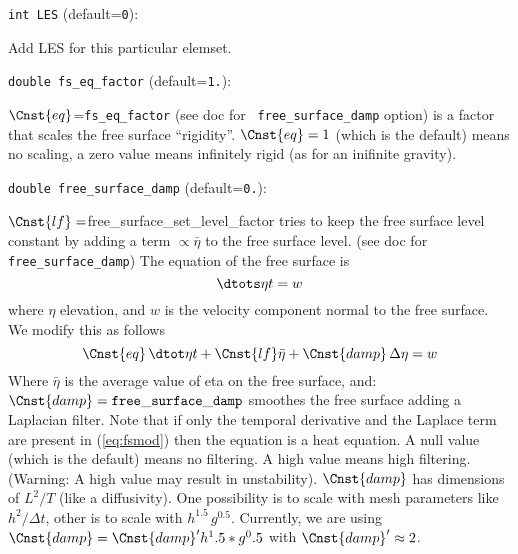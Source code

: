 \item\verb+int LES+ {\rm(default=\verb|0|)}:

Add LES for this particular elemset.

\item\verb+double fs_eq_factor+ {\rm(default=\verb|1.|)}:

$\Cnst{eq}$={\tt fs\_eq\_factor} (see doc for {\tt
free\_surface\_damp} option) is a factor that scales the free
surface ``rigidity''. $\Cnst{eq}=1$ (which is the default) means
no scaling, a zero value means infinitely rigid (as for an
inifinite gravity).

\item\verb+double free_surface_damp+ {\rm(default=\verb|0.|)}:

$\Cnst{lf}=${\alltt free\_surface\_set\_level\_factor} tries to
keep the free surface level constant by adding a term $\propto
\bar\eta$ to the free surface level.  (see doc for {\tt
free\_surface\_damp})
\label{sec:free_surface}
The equation of the free surface is
%
\begin{equation} 
\dtots\eta t = w
\end{equation}
%
where $\eta$ 
elevation, and $w$ is the velocity component normal to the free
surface. We modify this as follows 
%
\begin{equation} \label{eq:fsmod}  
\Cnst{eq}\,\dtot\eta t 
   + \Cnst{lf} \bar{\eta} + \Cnst{damp} \, \Delta \eta = w
\end{equation}
%
Where $\bar\eta$ is the average value of eta on the free surface, and:
$\Cnst{damp}={\tt free\_surface\_damp}$ smoothes the free surface
adding a Laplacian filter.  Note that if only the temporal derivative
and the Laplace term are present in (\ref{eq:fsmod}) then the equation
is a heat equation. A null value (which is the default) means no
filtering. A high value means high filtering. (Warning: A high value
may result in unstability).  $\Cnst{damp}$ has dimensions of $L^2/T$
(like a diffusivity). One possibility is to scale with mesh parameters
like $h^2/\Delta t$, other is to scale with $h^1.5 \,
g^0.5$. Currently, we are using $\Cnst{damp} = \Cnst{damp}' h^1.5 *
g^0.5$ with $\Cnst{damp}'\approx 2$.

